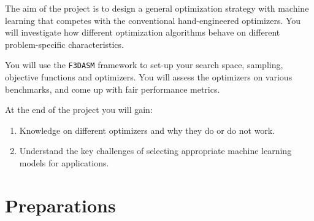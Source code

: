 \documentclass[10pt,a4paper,twoside]{article} %
\def\code#1{\texttt{#1}}
\begin{document}

The aim of the project is to design a general optimization strategy with machine learning that competes with the conventional hand-engineered optimizers. You will investigate how different optimization algorithms behave on different problem-specific characteristics. 

You will use the \code{F3DASM} framework to set-up your search space, sampling, objective functions and optimizers. You will assess the optimizers on various benchmarks, and come up with fair performance metrics.

At the end of the project you will gain:
\begin{enumerate}
	\item Knowledge on different optimizers and why they do or do not work.
	\item Understand the key challenges of selecting appropriate machine learning models for applications.

\end{enumerate}

\section*{Preparations}

\vspace{5mm}
 
\end{document}
